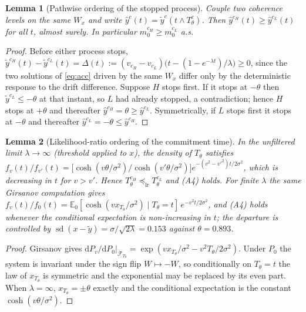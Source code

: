 \documentclass[11pt,a4paper]{article}
\newcommand{\E}{\mathbb{E}}
\newcommand{\dd}{\mathrm{d}}
\theoremstyle{plain}
\newtheorem{lemma}{Lemma}
\theoremstyle{remark}
\begin{document}
\begin{lemma}[Pathwise ordering of the stopped process]
\label{lem:coupling}
Couple two coherence levels on the same $W_x$ and write
$\hat y^{c}(t)=\tilde y^{c}(t\wedge T_\theta^{c})$. Then
$\hat y^{c_H}(t)\ge\hat y^{c_L}(t)$ for all $t$, almost surely. In particular
$m_0^{c_H}\ge m_0^{c_L}$ a.s.
\end{lemma}

\begin{proof}
Before either process stops,
$\tilde y^{c_H}(t)-\tilde y^{c_L}(t)=\Delta(t):=(v_{c_H}-v_{c_L})\bigl(t-(1-e^{-\lambda t})/\lambda\bigr)\ge0$,
since the two solutions of \eqref{eq:acc} driven by the same $W_x$ differ only by the
deterministic response to the drift difference. Suppose $H$ stops first. If it stops at
$-\theta$ then $\tilde y^{c_L}\le-\theta$ at that instant, so $L$ had already stopped, a
contradiction; hence $H$ stops at $+\theta$ and thereafter
$\hat y^{c_H}=\theta\ge\hat y^{c_L}$. Symmetrically, if $L$ stops first it stops at
$-\theta$ and thereafter $\hat y^{c_L}=-\theta\le\hat y^{c_H}$.
\end{proof}

\begin{lemma}[Likelihood-ratio ordering of the commitment time]
\label{lem:girsanov}
In the unfiltered limit $\lambda\to\infty$ (threshold applied to $x$), the density of
$T_\theta$ satisfies
$f_{v}(t)/f_{v'}(t)=\bigl[\cosh(v\theta/\sigma^2)/\cosh(v'\theta/\sigma^2)\bigr]
e^{-(v^2-v'^2)t/2\sigma^2}$, which is decreasing in $t$ for $v>v'$. Hence
$T_\theta^{c_H}\preceq_{\mathrm{lr}}T_\theta^{c_L}$ and (A4) holds.
For finite $\lambda$ the same Girsanov computation gives
$f_v(t)/f_0(t)=\E_0[\cosh(v x_{T_\theta}/\sigma^2)\mid T_\theta=t]\,e^{-v^2t/2\sigma^2}$,
and (A4) holds whenever the conditional expectation is non-increasing in $t$; the
departure is controlled by
$\operatorname{sd}(x-\tilde y)=\sigma/\sqrt{2\lambda}=0.153$ against $\theta=0.893$.
\end{lemma}

\begin{proof}
Girsanov gives $\dd P_v/\dd P_0|_{\mathcal F_{T_\theta}}
=\exp(vx_{T_\theta}/\sigma^2-v^2T_\theta/2\sigma^2)$. Under $P_0$ the system is invariant
under the sign flip $W\mapsto-W$, so conditionally on $T_\theta=t$ the law of
$x_{T_\theta}$ is symmetric and the exponential may be replaced by its even part.
When $\lambda=\infty$, $x_{T_\theta}=\pm\theta$ exactly and the conditional expectation is
the constant $\cosh(v\theta/\sigma^2)$.
\end{proof}
\end{document}
